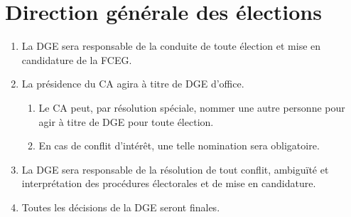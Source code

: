 \section{Direction générale des élections}
\label{direction-generale-des-elections}

\begin{enumerate}
 \item La DGE sera responsable de la conduite de toute élection et mise en candidature de la FCEG.
 \item La présidence du CA agira à titre de DGE d'office.
  \begin{enumerate}
   \item Le CA peut, par résolution spéciale, nommer une autre personne pour agir à titre de DGE pour toute élection.
   \item En cas de conflit d'intérêt, une telle nomination sera obligatoire.
  \end{enumerate}
 \item La DGE sera responsable de la résolution de tout conflit, ambiguïté et interprétation des procédures électorales et de mise en candidature.
 \item Toutes les décisions de la DGE seront finales.
\end{enumerate}
